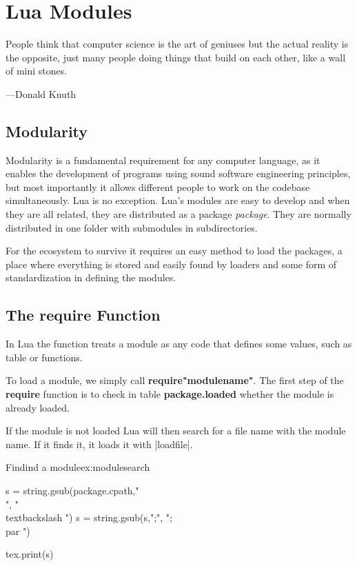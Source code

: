 

           
\chapter{Lua Modules}

\epigraph{People think that computer science is the art of geniuses but the actual reality is the opposite, just many people doing things that build on each other, like a wall of mini stones.}{---Donald Knuth}


\section{Modularity}

Modularity is a fundamental requirement for any computer language, as it enables the development of programs using sound software engineering principles, but most importantly it allows different people to work on the codebase simultaneously. Lua is no exception. Lua's modules are easy to develop and when they are all related, they are distributed as a package \textit{package}. They are normally distributed in one folder with submodules in subdirectories. 

For the ecosystem to survive it requires an easy method to load the packages, a place where everything is stored and easily found by loaders and some form of standardization in defining the modules. 

\section{The require Function}

In Lua the  function treats a module as any code that defines some values, such as table or functions. 

To load  a module, we simply call \textbf{require"modulename"}. The first step of the \textbf{require} function is to check in table \textbf{package.loaded} whether the module is already loaded.

If the module is not loaded Lua will then search for a file name with the module name. If it finds it, it loads it with |loadfile|. 


\begin{texexample}{Findind a module}{ex:modulesearch}
\begin{luacode*}
s = string.gsub(package.cpath,"\\", "\\textbackslash ")
s = string.gsub(s,";", ";\\par ")

tex.print(s)
\end{luacode*}
\end{texexample}

